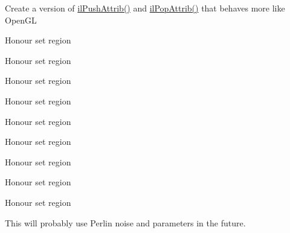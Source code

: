 
\begin{DoxyRefList}
\item[\label{todo__todo000001}%
\hypertarget{todo__todo000001}{}%
Global \hyperlink{group__state_ga72e0879c71f59f06c35d2e2a10191fa8}{il\+Push\+Attrib} (I\+Luint Bits)]Create a version of \hyperlink{group__state_ga72e0879c71f59f06c35d2e2a10191fa8}{il\+Push\+Attrib()} and \hyperlink{group__state_gacc9ee35a9e48b55880655f6d143f39c1}{il\+Pop\+Attrib()} that behaves more like Open\+G\+L


\item[\label{todo__todo000002}%
\hypertarget{todo__todo000002}{}%
Global \hyperlink{group__ilu__filter_gacb6e1a0e8dc10748f1cfbf60b1f8c350}{ilu\+Alienify} (void)]Honour set region  
\item[\label{todo__todo000003}%
\hypertarget{todo__todo000003}{}%
Global \hyperlink{group__ilu__filter_ga017478330f243e5bb6e6edc29cdf1f37}{ilu\+Blur\+Avg} (I\+Luint Iter)]Honour set region  
\item[\label{todo__todo000004}%
\hypertarget{todo__todo000004}{}%
Global \hyperlink{group__ilu__filter_ga4163c484488b3afc352e3ed6c768babf}{ilu\+Blur\+Gaussian} (I\+Luint Iter)]Honour set region  
\item[\label{todo__todo000005}%
\hypertarget{todo__todo000005}{}%
Global \hyperlink{group__ilu__filter_gaeb5bb85ceb172bd9742f7f0730a1d440}{ilu\+Convolution} (I\+Lint $\ast$matrix, I\+Lint scale, I\+Lint bias)]Honour set region  
\item[\label{todo__todo000006}%
\hypertarget{todo__todo000006}{}%
Global \hyperlink{group__ilu__filter_gafbd320c463d5e8a45e68d0edb3973597}{ilu\+Edge\+Detect\+E} ()]Honour set region  
\item[\label{todo__todo000007}%
\hypertarget{todo__todo000007}{}%
Global \hyperlink{group__ilu__filter_gac902e008927e48ce132306e344f5010d}{ilu\+Edge\+Detect\+P} ()]Honour set region  
\item[\label{todo__todo000008}%
\hypertarget{todo__todo000008}{}%
Global \hyperlink{group__ilu__filter_ga91f176b607f5357b748079e21a6bbc63}{ilu\+Edge\+Detect\+S} ()]Honour set region  
\item[\label{todo__todo000009}%
\hypertarget{todo__todo000009}{}%
Global \hyperlink{group__ilu__filter_gab94eba669177860af590c7bed1927c30}{ilu\+Emboss} ()]Honour set region  
\item[\label{todo__todo000010}%
\hypertarget{todo__todo000010}{}%
Global \hyperlink{group__ilu__colour_ga0e3910809ea18e77a83cee05e12613ef}{ilu\+Invert\+Alpha} ()]Honour set region  
\item[\label{todo__todo000011}%
\hypertarget{todo__todo000011}{}%
Global \hyperlink{group__ilu__filter_gac4c1596626e01c41075c7fdeda113642}{ilu\+Noisify} (I\+Lclampf Tolerance)]This will probably use Perlin noise and parameters in the future.



\end{DoxyRefList}
